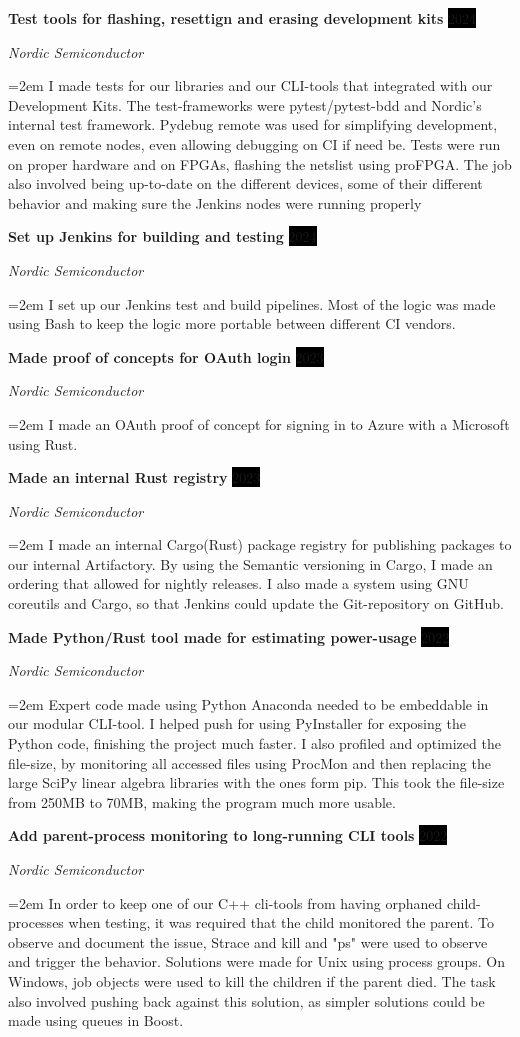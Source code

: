 \documentclass[paper=a4,fontsize=11pt,norsk]{scrartcl} %
\newcommand{\EducationEntry}[4]{
		\noindent \textbf{#1} \hfill      %
		\colorbox{Black}{%
			\parbox{6em}{%
			\hfill\color{White}#2}} \par  %
		\noindent \textit{#3} \par        %
		\noindent\hangindent=2em\hangafter=0 \small #4 %
		\normalsize \par}
\newcommand{\WorkEntry}[4]{				  %
		\noindent \textbf{#1} \hfill      %
		\colorbox{Black}{\color{White}#2} \par  %
		\noindent \textit{#3} \par              %
		\noindent\hangindent=2em\hangafter=0 \small #4 %
		\normalsize \par}
\begin{document}


\WorkEntry{Test tools for flashing, resettign and erasing development kits}{2024}{Nordic Semiconductor} { I made tests for our libraries and our CLI-tools that integrated with our Development Kits. The test-frameworks were pytest/pytest-bdd and Nordic's internal test framework. Pydebug remote was used for simplifying development, even on remote nodes, even allowing debugging on CI if need be. Tests were run on proper hardware and on FPGAs, flashing the netslist using proFPGA. The job also involved being up-to-date on the different devices, some of their different behavior and making sure the Jenkins nodes were running properly }
\WorkEntry{Set up Jenkins for building and testing}{2024}{Nordic Semiconductor} { I set up our Jenkins test and build pipelines. Most of the logic was made using Bash to keep the logic more portable between different CI vendors. }
\WorkEntry{Made proof of concepts for OAuth login}{2023}{Nordic Semiconductor} { I made an OAuth proof of concept for signing in to Azure with a Microsoft using Rust. }
\WorkEntry{Made an internal Rust registry}{2023}{Nordic Semiconductor} { I made an internal Cargo(Rust) package registry for publishing packages to our internal Artifactory. By using the Semantic versioning in Cargo, I made an ordering that allowed for nightly releases. I also made a system using GNU coreutils and Cargo, so that Jenkins could update the Git-repository on GitHub. }
\WorkEntry{Made Python/Rust tool made for estimating power-usage}{2022}{Nordic Semiconductor} { Expert code made using Python Anaconda needed to be embeddable in our modular CLI-tool. I helped push for using PyInstaller for exposing the Python code, finishing the project much faster. I also profiled and optimized the file-size, by monitoring all accessed files using ProcMon and then replacing the large SciPy linear algebra libraries with the ones form pip. This took the file-size from 250MB to 70MB, making the program much more usable. }
\WorkEntry{Add parent-process monitoring to long-running CLI tools}{2022}{Nordic Semiconductor} { In order to keep one of our C++ cli-tools from having orphaned child-processes when testing, it was required that the child monitored the parent. To observe and document the issue, Strace and kill and "ps" were used to observe and trigger the behavior. Solutions were made for Unix using process groups. On Windows, job objects were used to kill the children if the parent died. The task also involved pushing back against this solution, as simpler solutions could be made using queues in Boost. }
\end{document}
